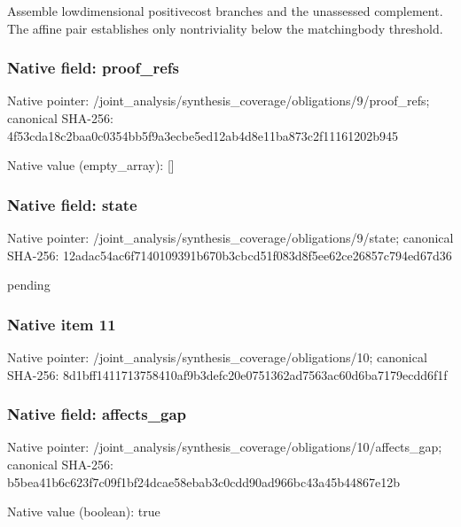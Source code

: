 \documentclass[10pt,a4paper]{article}
\begin{document}
Assemble lowdimensional positivecost branches and the unassessed complement. The affine pair establishes only nontriviality below the matchingbody threshold.


\subsubsection{Native field: proof\_refs}


Native pointer: /joint\_analysis/synthesi\allowbreak{}s\_coverage/obligations/9\allowbreak{}/proof\_refs; canonical SHA-256: 4f53cda18c2baa0c0354bb5f\allowbreak{}9a3ecbe5ed12ab4d8e11ba87\allowbreak{}3c2f11161202b945



Native value (empty\_array): []



\subsubsection{Native field: state}


Native pointer: /joint\_analysis/synthesi\allowbreak{}s\_coverage/obligations/9\allowbreak{}/state; canonical SHA-256: 12adac54ac6f7140109391b6\allowbreak{}70b3cbcd51f083d8f5ee62ce\allowbreak{}26857c794ed67d36


pending


\subsubsection{Native item 11}


Native pointer: /joint\_analysis/synthesi\allowbreak{}s\_coverage/obligations/1\allowbreak{}0; canonical SHA-256: 8d1bff1411713758410af9b3\allowbreak{}defc20e0751362ad7563ac60\allowbreak{}d6ba7179ecdd6f1f



\subsubsection{Native field: affects\_gap}


Native pointer: /joint\_analysis/synthesi\allowbreak{}s\_coverage/obligations/1\allowbreak{}0/affects\_gap; canonical SHA-256: b5bea41b6c623f7c09f1bf24\allowbreak{}dcae58ebab3c0cdd90ad966b\allowbreak{}c43a45b44867e12b



Native value (boolean): true
\end{document}
